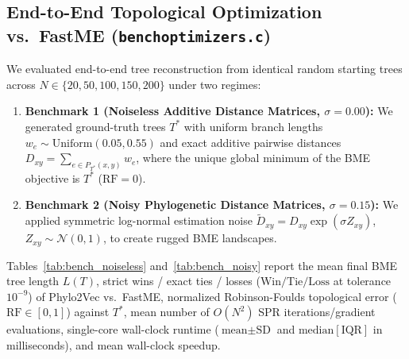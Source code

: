 \documentclass[11pt,a4paper]{article}
\makeatletter
\DeclareRobustCommand{\_}{\ifmmode\nfss@text{\textunderscore}\else\textunderscore\allowbreak\fi}
\theoremstyle{definition}
\makeatother
\begin{document}
\subsection{End-to-End Topological Optimization vs.\ FastME (\texttt{bench\_optimizers.c})}
We evaluated end-to-end tree reconstruction from identical random starting trees across $N \in \{20, 50, 100, 150, 200\}$ under two regimes:
\begin{enumerate}
    \item \textbf{Benchmark 1 (Noiseless Additive Distance Matrices, $\sigma = 0.00$):} We generated ground-truth trees $T^*$ with uniform branch lengths $w_e \sim \text{Uniform}(0.05, 0.55)$ and exact additive pairwise distances $D_{xy} = \sum_{e \in P_{T^*}(x,y)} w_e$, where the unique global minimum of the BME objective is $T^*$ ($\text{RF} = 0$).
    \item \textbf{Benchmark 2 (Noisy Phylogenetic Distance Matrices, $\sigma = 0.15$):} We applied symmetric log-normal estimation noise $\tilde{D}_{xy} = D_{xy} \exp(\sigma Z_{xy})$, $Z_{xy} \sim \mathcal{N}(0, 1)$, to create rugged BME landscapes.
\end{enumerate}

Tables~\ref{tab:bench_noiseless} and~\ref{tab:bench_noisy} report the mean final BME tree length $L(T)$, strict wins / exact ties / losses ($\text{Win/Tie/Loss}$ at tolerance $10^{-9}$) of Phylo2Vec vs.\ FastME, normalized Robinson-Foulds topological error ($\text{RF} \in [0, 1]$) against $T^*$, mean number of $O(N^2)$ SPR iterations/gradient evaluations, single-core wall-clock runtime ($\text{mean} \pm \text{SD}$ and $\text{median}[\text{IQR}]$ in milliseconds), and mean wall-clock speedup.
\end{document}
